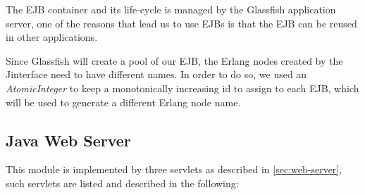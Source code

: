 \documentclass[a4paper]{article}
\begin{document}
The EJB container and its life-cycle is managed by the Glassfish application server, one of the reasons that lead us to use EJBs is that the EJB can be reused in other applications. 

Since Glassfish will create a pool of our EJB, the Erlang nodes created by the 
Jinterface need to have different names. In order to do so, we used 
an \emph{AtomicInteger} to keep a monotonically increasing id to assign to 
each EJB, which will be used to generate a different Erlang node name.

\subsection{Java Web Server}
This module is implemented by three servlets as described in \ref{sec:web-server}, such servlets are listed and described in the following:
\end{document}

